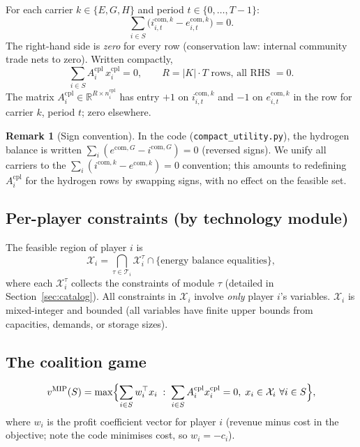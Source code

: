 \documentclass[11pt]{article}
\theoremstyle{definition}
\newtheorem{remark}{Remark}
\newcommand{\R}{\mathbb{R}}
\newcommand{\xcom}{x^{\mathrm{cpl}}}
\newcommand{\Acom}{A^{\mathrm{cpl}}}
\newcommand{\feas}{\mathcal{X}}
\newcommand{\vmip}{v^{\mathrm{MIP}}}
\newcommand{\Tech}{\mathcal{T}}
\begin{document}
For each carrier $k\in\{E,G,H\}$ and period $t\in\{0,\dots,T-1\}$:
\begin{equation}
\sum_{i\in S}\bigl(i^{\mathrm{com},k}_{i,t}-e^{\mathrm{com},k}_{i,t}\bigr)=0.
\label{eq:community-balance}
\end{equation}
The right-hand side is \emph{zero} for every row (conservation law:
internal community trade nets to zero).  Written compactly,
\begin{equation}
\sum_{i\in S}\Acom_i\,\xcom_i=0,
\qquad R=|K|\cdot T\text{ rows, all RHS }=0.
\label{eq:coupling-compact}
\end{equation}
The matrix $\Acom_i\in\R^{R\times n_i^{\mathrm{cpl}}}$ has entry $+1$
on $i^{\mathrm{com},k}_{i,t}$ and $-1$ on $e^{\mathrm{com},k}_{i,t}$
in the row for carrier $k$, period $t$; zero elsewhere.

\begin{remark}[Sign convention]
\label{rem:sign}
In the code (\texttt{compact\_utility.py}), the hydrogen balance is
written $\sum_i(e^{\mathrm{com},G}-i^{\mathrm{com},G})=0$ (reversed
signs).  We unify all carriers to the
$\sum_i(i^{\mathrm{com},k}-e^{\mathrm{com},k})=0$ convention; this
amounts to redefining $\Acom_i$ for the hydrogen rows by swapping
signs, with no effect on the feasible set.
\end{remark}

\subsection{Per-player constraints (by technology module)}

The feasible region of player $i$ is
\begin{equation}
\feas_i=\bigcap_{\tau\in\Tech_i}\feas_i^{\tau}
  \cap\bigl\{\text{energy balance equalities}\bigr\},
\label{eq:feasi}
\end{equation}
where each $\feas_i^{\tau}$ collects the constraints of module $\tau$
(detailed in Section~\ref{sec:catalog}).  All constraints in $\feas_i$
involve \emph{only} player $i$'s variables.  $\feas_i$ is mixed-integer
and bounded (all variables have finite upper bounds from capacities,
demands, or storage sizes).

\subsection{The coalition game}

\begin{equation}
\vmip(S)=\max\Bigl\{\sum_{i\in S}w_i^{\top}x_i\;:\;
\sum_{i\in S}\Acom_i\xcom_i=0,\;x_i\in\feas_i\ \forall i\in S\Bigr\},
\label{eq:vmip}
\end{equation}
where $w_i$ is the profit coefficient vector for player $i$ (revenue
minus cost in the objective; note the code minimises cost, so
$w_i=-c_i$).
\end{document}

